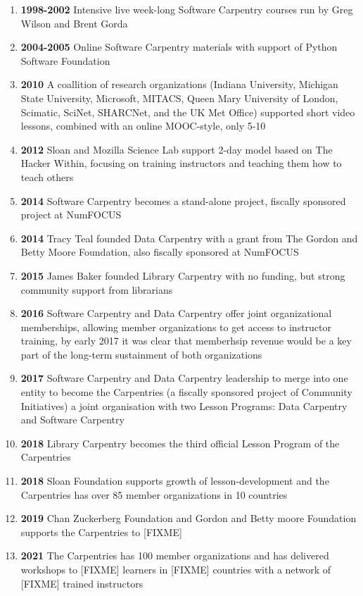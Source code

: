 \begin{enumerate} 
\item \textbf{1998-2002} Intensive live week-long Software Carpentry courses run by Greg Wilson and Brent Gorda
\item \textbf{2004-2005} Online Software Carpentry materials with support of Python Software Foundation
\item \textbf{2010} A coallition of research organizations (Indiana University, Michigan State University, Microsoft, MITACS, Queen Mary University of London, Scimatic, SciNet, SHARCNet, and the UK Met Office) supported short video lessons, combined with an online MOOC-style, only 5-10%
\item \textbf{2012} Sloan and Mozilla Science Lab support 2-day model based on The Hacker Within, focusing on training instructors and teaching them how to teach others
\item \textbf{2014} Software Carpentry becomes a stand-alone project, fiscally sponsored project at NumFOCUS
\item \textbf{2014} Tracy Teal founded Data Carpentry with a grant from The Gordon and Betty Moore Foundation, also fiscally sponsored at NumFOCUS
\item \textbf{2015} James Baker founded Library Carpentry with no funding, but strong community support from librarians
\item \textbf{2016} Software Carpentry and Data Carpentry offer joint organizational memberships, allowing member organizations to get access to instructor training, by early 2017 it was clear that memberhsip revenue would be a key part of the long-term sustainment of both organizations
\item \textbf{2017} Software Carpentry and Data Carpentry leadership to merge into one entity to become the Carpentries (a fiscally sponsored project of Community Initiatives) a joint organisation with two Lesson Programs: Data Carpentry and Software Carpentry
\item \textbf{2018} Library Carpentry becomes the third official Lesson Program of the Carpentries
\item \textbf{2018} Sloan Foundation supports growth of lesson-development and the Carpentries has over 85 member organizations in 10 countries
\item \textbf{2019} Chan Zuckerberg Foundation and Gordon and Betty moore Foundation supports the Carpentries to [FIXME] 
\item \textbf{2021} The Carpentries has 100 member organizations and has delivered workshops to [FIXME] learners in [FIXME] countries with a network of [FIXME] trained instructors 
\end{enumerate}
